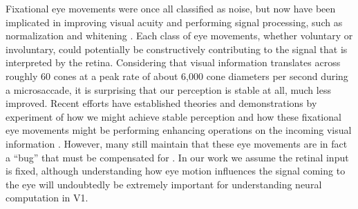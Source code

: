 Fixational eye movements were once all classified as noise, but now have been implicated in improving visual acuity \cite{ratnam2017benefits, rucci2007miniature} and performing signal processing, such as normalization and whitening \cite{aytekin2014visual}. Each class of eye movements, whether voluntary or involuntary, could potentially be constructively contributing to the signal that is interpreted by the retina. Considering that visual information translates across roughly 60 cones at a peak rate of about 6,000 cone diameters per second during a microsaccade, it is surprising that our perception is stable at all, much less improved. Recent efforts have established theories and demonstrations by experiment of how we might achieve stable perception \cite{arathorn2013unstable, bridgeman2010brain, murakami1998jitter, burak2010bayesian} and how these fixational eye movements might be performing enhancing operations on the incoming visual information \cite{ahissar2012seeing, mostofi2016visual, kenyon2004correlated}. However, many still maintain that these eye movements are in fact a ``bug'' that must be compensated for \cite{packer1992blurring, kowler1979miniature, engbert2011integrated}. In our work we assume the retinal input is fixed, although understanding how eye motion influences the signal coming to the eye will undoubtedly be extremely important for understanding neural computation in V1.


